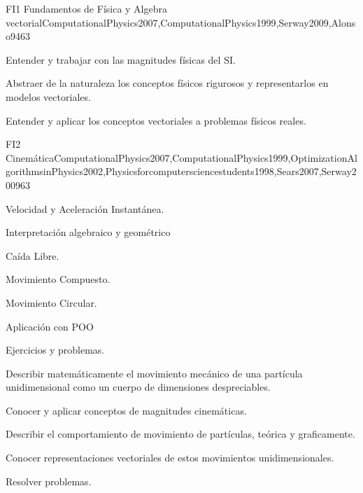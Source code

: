 \begin{syllabus}
\begin{unit}{FI1 Fundamentos de Física y Algebra vectorial}{ComputationalPhysics2007,ComputationalPhysics1999,Serway2009,Alonso94}{6}{3}
   \begin{learningoutcomes}
      \item Entender y trabajar con las magnitudes físicas del SI.
      \item Abstraer de la naturaleza los conceptos físicos rigurosos y
      representarlos en modelos vectoriales.
      \item Entender y aplicar los conceptos vectoriales a problemas físicos reales.
   \end{learningoutcomes}
\end{unit}

\begin{unit}{FI2 Cinemática}{ComputationalPhysics2007,ComputationalPhysics1999,OptimizationAlgorithmsinPhysics2002,Physicsforcomputersciencestudents1998,Sears2007,Serway2009}{6}{3}
\begin{topics}
      \item Velocidad y Aceleración Instantánea.
      \item Interpretación algebraico y geométrico
      \item Caída Libre.
      \item Movimiento Compuesto.
      \item Movimiento Circular.
      \item Aplicación con POO
      \item Ejercicios y problemas.
    \end{topics}
   \begin{learningoutcomes}
      \item Describir matemáticamente el movimiento mecánico de una partícula unidimensional como un cuerpo de dimensiones despreciables.
      \item Conocer y aplicar conceptos de magnitudes cinemáticas.
      \item Describir el comportamiento de movimiento de partículas, teórica y graficamente.
      \item Conocer representaciones vectoriales de estos movimientos unidimensionales.
      \item Resolver problemas.
   \end{learningoutcomes}
\end{unit}


\end{syllabus}
